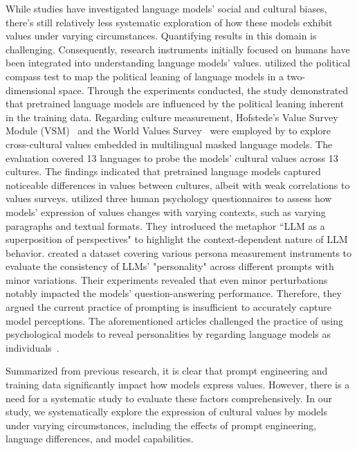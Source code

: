 \documentclass[11pt]{article}
\begin{document}
While studies have investigated language models' social and cultural biases, there's still relatively less systematic exploration of how these models exhibit values under varying circumstances. Quantifying results in this domain is challenging. Consequently, research instruments initially focused on humans have been integrated into understanding language models' values. \citet{feng-etal-2023-pretraining} utilized the political compass test to map the political leaning of language models in a two-dimensional space. Through the experiments conducted, the study demonstrated that pretrained language models are influenced by the political leaning inherent in the training data. Regarding culture measurement, Hofstede's Value Survey Module (VSM)~\cite{vsm2013-jj} and the World Values Survey~\cite{Inglehart2014wvs} were employed by \cite{arora2023probing} to explore cross-cultural values embedded in multilingual masked language models. The evaluation covered 13 languages to probe the models' cultural values across 13 cultures. The findings indicated that pretrained language models captured noticeable differences in values between cultures, albeit with weak correlations to values surveys.
\citet{kovač2023large} utilized three human psychology questionnaires to assess how models' expression of values changes with varying contexts, such as varying paragraphs and textual formats. They introduced the metaphor ``LLM as a superposition of perspectives" to highlight the context-dependent nature of LLM behavior.
\citet{shu2023dont} created a dataset covering various persona measurement instruments to evaluate the consistency of LLMs' "personality" across different prompts with minor variations. Their experiments revealed that even minor perturbations notably impacted the models' question-answering performance. Therefore, they argued the current practice of prompting is insufficient to accurately capture model perceptions. The aforementioned articles challenged the practice of using psychological models to reveal personalities by regarding language models as individuals~\cite{bodroza2023personality,pan2023llms}.

Summarized from previous research, it is clear that prompt engineering and training data significantly impact how models express values. However, there is a need for a systematic study to evaluate these factors comprehensively. In our study, we systematically explore the expression of cultural values by models under varying circumstances, including the effects of prompt engineering, language differences, and model capabilities.
\end{document}
